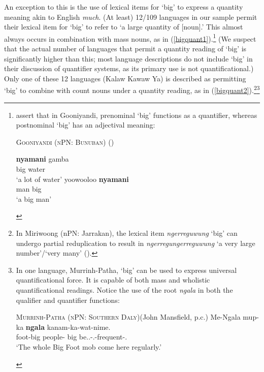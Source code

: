\documentclass[12pt,egregdoesnotlikesansseriftitles]{scrartcl}
\begin{document}
An exception to this is the use of lexical items for `big' to express a quantity meaning akin to English \textit{much}. (At least) 12/109 languages in our sample permit their lexical item for `big' to refer to `a large quantity of [noun].' This almost always occurs in combination with mass nouns, as in (\ref{bigquant1}).\footnote{\citet[37]{louagieverstraete16} assert that in Gooniyandi, prenominal `big' functions as a quantifier, whereas postnominal `big' has an adjectival meaning:
    \vspace{-2mm} %
    \begin{exe}
      \ex  \textsc{Gooniyandi (nPN: Bunuban)} \hfill(\citealt{mcgregor90})
      \begin{xlist}
        \begin{multicols}{2}
          \ex \gll \textbf{nyamani} gamba\\
          big water \\
          \glt `a lot of water'%
          \ex \gll yoowooloo \textbf{nyamani} \\
          man big \\
          \glt `a big man' %
        \end{multicols}
      \end{xlist}
    \end{exe}
} 
(We suspect that the actual number of languages that permit a quantity reading of `big' is significantly higher than this; most language descriptions do not include `big' in their discussion of quantifier systems, as its primary use is not quantificational.) Only one of these 12 languages (Kalaw Kawaw Ya) is described as permitting `big' to combine with count nouns under a quantity reading, as in (\ref{bigquant2}).\footnote{In Miriwoong (nPN: Jarrakan), the lexical item \textit{ngerreguwung} `big' can undergo partial reduplication to result in \textit{ngerregungerreguwung} `a very large number'/`very many' (\citealt[43]{kofod78}).}\footnote{In one language, Murrinh-Patha, `big' can be used to express universal quantificational force. It is capable of both mass and wholistic quantificational readings. Notice the use of the root \textit{ngala} in both the qualifier and quantifier functions:
  \vspace{-2mm}
  \begin{exe}
    \ex \textsc{Murrinh-Patha (nPN: Southern Daly)}\hfill (John Mansfield, p.c.)
    \gll Me-Ngala mup-ka \textbf{ngala} kanam-ka-wat-nime.\\
    foot-big people-\Top{} big be.\Tsg.\Nfut-\Pauc.\Sarg-frequent-\Pauc.\M\\
    \glt `The whole Big Foot mob come here regularly.'
  \end{exe}
}
\end{document}
